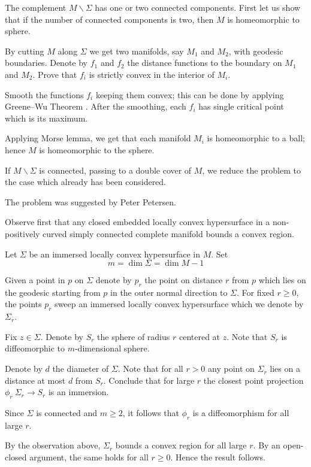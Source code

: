 The complement $M\backslash\Sigma$ has one or two connected components.
First let us show that if the number of connected components is two, 
then $M$ is homeomorphic to sphere.

By cutting $M$ along $\Sigma$ 
we get two manifolds, say $M_1$ and $M_2$,
with geodesic boundaries. 
Denote by $f_1$ and $f_2$ the distance functions to the boundary on $M_1$ and $M_2$.
Prove that  
$f_i$ is strictly convex in the interior of $M_i$.

Smooth the functions $f_i$ keeping them convex; 
this can be done by applying Greene--Wu Theorem \cite[see Thm. 2 in][]{greene-wu}.
After the smoothing, each $f_i$ has single critical point which is its maximum.

Applying Morse lemma, we get that each manifold $M_i$ is homeomorphic to a ball; 
hence $M$ 
is homeomorphic to the sphere.

If $M\backslash\Sigma$ is connected,
passing to a double cover of $M$,
we reduce the problem to the case which already has been considered.\qeds

The problem was suggested by Peter Petersen.



Observe first that any closed embedded locally convex hypersurface in a non-positively curved simply connected complete manifold bounds a convex region.


Let $\Sigma$ be an immersed locally convex hypersurface in $M$.
Set 
\[m=\dim \Sigma=\dim M-1\]

Given a point in $p$ on $\Sigma$ 
denote by $p_r$ the point on distance $r$ from $p$
which lies on the geodesic starting from $p$ in the outer normal direction to $\Sigma$.
For fixed $r\ge 0$,
the points $p_r$ sweep an immersed locally convex hypersurface which we denote by $\Sigma_r$.

Fix $z\in \Sigma$.
Denote by $S_r$ the sphere of radius $r$ centered at $z$.
Note that $S_r$ is diffeomorphic to $m$-dimensional sphere.

Denote by $d$ the diameter of $\Sigma$.
Note that for all $r>0$
any point on $\Sigma_r$
lies on a distance at most $d$ from $S_r$.
Conclude that for large $r$ the closest point projection $\phi_r\:\Sigma_r\to S_r$ is an immersion.


Since $\Sigma$ is connected
and $m\ge 2$, it follows that $\phi_r$ is a diffeomorphism for all large $r$.

By the observation above, $\Sigma_r$ bounds a convex region for all large $r$.
By an open-closed argument, the same holds for all $r\ge 0$.
Hence the result follows.\qeds

